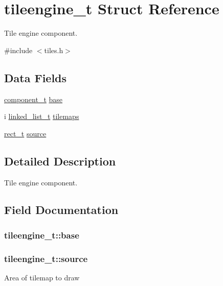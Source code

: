 \hypertarget{structtileengine__t}{}\section{tileengine\+\_\+t Struct Reference}
\label{structtileengine__t}


Tile engine component.  




{\ttfamily \#include $<$tiles.\+h$>$}

\subsection*{Data Fields}
\begin{DoxyCompactItemize}
\item 
\hyperlink{structcomponent__t}{component\+\_\+t} \hyperlink{structtileengine__t_a2bc269e9bc59aa063305bbfb9c1b1e90}{base}
\item 
i \hyperlink{structlinked__list__t}{linked\+\_\+list\+\_\+t} \hyperlink{structtileengine__t_accc82561bdd41b3046e3df58c519c75c}{tilemaps}
\item 
\hyperlink{structrect__t}{rect\+\_\+t} \hyperlink{structtileengine__t_ab8d030de148154d3ce462b94a8e4dc6f}{source}
\end{DoxyCompactItemize}


\subsection{Detailed Description}
Tile engine component. 

\subsection{Field Documentation}
\subsubsection[{\texorpdfstring{base}{base}}]{ tileengine\+\_\+t\+::base}\hypertarget{structtileengine__t_a2bc269e9bc59aa063305bbfb9c1b1e90}{}\label{structtileengine__t_a2bc269e9bc59aa063305bbfb9c1b1e90}
\subsubsection[{\texorpdfstring{source}{source}}]{ tileengine\+\_\+t\+::source}\hypertarget{structtileengine__t_ab8d030de148154d3ce462b94a8e4dc6f}{}\label{structtileengine__t_ab8d030de148154d3ce462b94a8e4dc6f}
Area of tilemap to draw 
